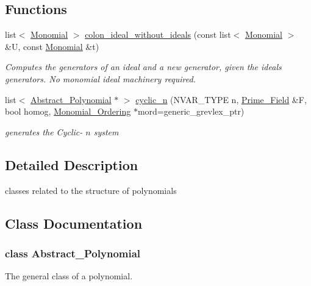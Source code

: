 \subsection*{Functions}
\begin{DoxyCompactItemize}
\item 
list$<$ \hyperlink{group__polygroup_class_monomial}{Monomial} $>$ \hyperlink{group__polygroup_gaf4655e829836ead5fe2ce766fb0cebbc}{colon\+\_\+ideal\+\_\+without\+\_\+ideals} (const list$<$ \hyperlink{group__polygroup_class_monomial}{Monomial} $>$ \&U, const \hyperlink{group__polygroup_class_monomial}{Monomial} \&t)
\begin{DoxyCompactList}\small\item\em Computes the generators of an ideal and a new generator, given the ideal\textquotesingle{}s generators. No monomial ideal machinery required. \end{DoxyCompactList}\item 
list$<$ \hyperlink{group__polygroup_class_abstract___polynomial}{Abstract\+\_\+\+Polynomial} $\ast$ $>$ \hyperlink{group__polygroup_gaa458dfbf51ecbb98f93bf8f0133725d0}{cyclic\+\_\+n} (N\+V\+A\+R\+\_\+\+T\+Y\+PE n, \hyperlink{group___fields_group_class_prime___field}{Prime\+\_\+\+Field} \&F, bool homog, \hyperlink{group__orderinggroup_class_monomial___ordering}{Monomial\+\_\+\+Ordering} $\ast$mord=generic\+\_\+grevlex\+\_\+ptr)
\begin{DoxyCompactList}\small\item\em generates the Cyclic-\/ $ n $ system \end{DoxyCompactList}\end{DoxyCompactItemize}


\subsection{Detailed Description}
classes related to the structure of polynomials 



\subsection{Class Documentation}
\label{class_abstract___polynomial}
\subsubsection{class Abstract\+\_\+\+Polynomial}
The general class of a polynomial. 

